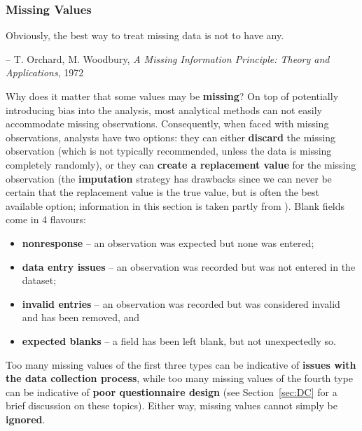 \subsubsection{Missing Values}    
\begin{tcolorbox}[title=Easier Said Than Done]
Obviously, the best way to treat missing data is not to have any. \\[-0.6cm]
\begin{flushright}
-- T. Orchard, M. Woodbury, \textit{A Missing Information Principle: Theory and Applications}, 1972
\end{flushright}
\end{tcolorbox}
\noindent Why does it matter that some values may be \textbf{missing}? On top of potentially introducing bias into the analysis, most analytical methods can not easily accommodate missing observations. Consequently, when faced with missing observations, analysts have two options: they can either \textbf{discard} the missing observation (which is not typically recommended, unless the data is missing completely randomly), or they can \textbf{create a replacement value} for the missing observation (the \textbf{imputation} strategy has drawbacks since we can never be certain that the replacement value is the true value, but is often the best available option; information in this section is taken partly from \cite{DP_Shinnie,DP_RLVHS,DP_vB,DP_R}).
\newpage\noindent Blank fields come in 4 flavours: \begin{itemize}[noitemsep]\item \textbf{nonresponse} -- an observation was expected but none was entered; \item  \textbf{data entry issues} -- an observation was recorded but was not entered in the dataset; \item \textbf{invalid entries} -- an observation was recorded but was considered invalid and has been removed, and \item  \textbf{expected blanks} -- a field has been left blank, but not unexpectedly so.
\end{itemize}
Too many missing values of the first three types can be indicative of \textbf{issues with the data collection process}, while too many missing values of the fourth type can be indicative of \textbf{poor questionnaire design} (see Section~\ref{sec:DC} for a brief discussion on these topics). Either way, missing values cannot simply be \textbf{ignored}.
